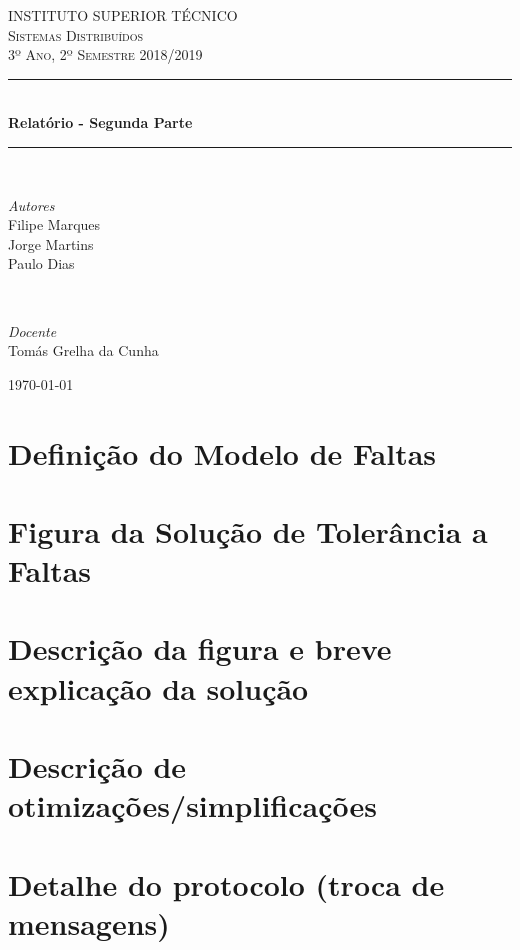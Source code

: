 \documentclass[a4paper]{article}
\begin{document}
\begin{titlepage}
	\newcommand{\HRule}{\rule{\linewidth}{0.5mm}}
	\center
	\textsc{\LARGE INSTITUTO SUPERIOR TÉCNICO}\\[1.0cm]
	\textsc{\Large Sistemas Distribuídos}\\[0.5cm]
	\textsc{\large 3º Ano, 2º Semestre 2018/2019}\\[0.2cm]
	
	\HRule\\[0.4cm]
	{\huge\bfseries Relatório - Segunda Parte}\\[0.2cm]
	\HRule\\[1.5cm]
	
	\begin{minipage}{0.4\textwidth}
		\begin{flushleft}
		\large
		\textit{Autores}\\
		Filipe Marques\\
		Jorge Martins\\
		Paulo Dias
		\end{flushleft}
	\end{minipage}
	~
	\begin{minipage}{0.4\textwidth}
		\begin{flushright}
		\large
		\textit{Docente}\\
		Tomás Grelha da Cunha
		\end{flushright}
	\end{minipage}
	
	\vfill
	\vfill
	\vfill
	{\large\today}
	\vfill
\end{titlepage}
\section{Definição do Modelo de Faltas}
\section{Figura da Solução de Tolerância a Faltas}
\section{Descrição da figura e breve explicação da solução}
\section{Descrição de otimizações/simplificações}
\section{Detalhe do protocolo (troca de mensagens)}
\end{document}
